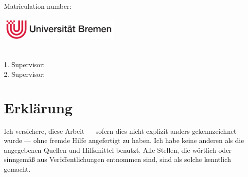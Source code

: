 \documentclass[twoside,openright,titlepage,numbers=noenddot,%
               headinclude,footinclude,cleardoublepage=empty,abstract=on,
               BCOR=5mm,paper=a4,listof=totocnumbered]{scrreprt}
\begin{document}
\title{\myTitle}
\subtitle{\mySubtitle}
\author{\myName}
\date{\myDate} 

\raggedbottom
{}
\captionsetup[subfigure]{justification=centering}

\pagestyle{plain}

\begin{titlepage}
    \begin{addmargin}[-1cm]{-3cm}
	\begin{center}
		\Huge
		\vspace*{1cm}
        \begingroup
            \myTitle \\ \bigskip
        \endgroup
		\LARGE
        \mySubtitle\\
		\vspace{3cm}
 		\Large
		\myName\\
		\vspace{6pt}
        Matriculation number: \myNumber\\
		\vspace{1cm}
		\myDate\\
		\vspace{2cm}
 		\includegraphics[width=6cm]{unibremen}\\
 		\vspace{1cm}
 		\large
 		\myDepartment\\
		\myDegree\\
		\vspace{4cm}
		\large
		1. Supervisor: \myProf\\
		2. Supervisor: \myOtherProf\\
		\vspace{1.5cm}
	\end{center}
    \end{addmargin}
\end{titlepage}
\cleardoublepage{}


\chapter*{Erklärung}\label{erklaerung}
Ich versichere, diese Arbeit --- sofern dies nicht explizit anders
gekennzeichnet wurde --- ohne fremde Hilfe angefertigt zu haben.  Ich
habe keine anderen als die angegebenen Quellen und Hilfsmittel
benutzt.  Alle Stellen, die wörtlich oder sinngemäß aus
Veröffentlichungen entnommen sind, sind als solche kenntlich gemacht.
\end{document}
